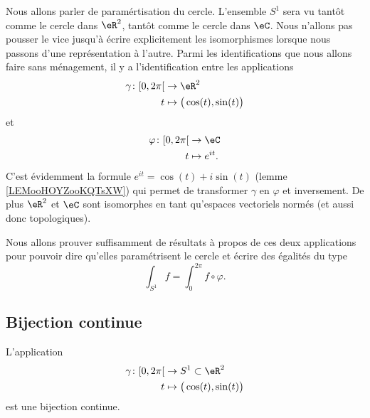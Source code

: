 Nous allons parler de paramértisation du cercle. L'ensemble \( S^1\) sera vu tantôt comme le cercle dans \( \eR^2\), tantôt comme le cercle dans \( \eC\). Nous n'allons pas pousser le vice jusqu'à écrire explicitement les isomorphismes lorsque nous passons d'une représentation à l'autre. Parmi les identifications que nous allons faire sans ménagement, il y a l'identification entre les applications
\begin{equation}
	\begin{aligned}
		\gamma\colon \mathopen[ 0 , 2\pi \mathclose[ & \to \eR^2                           \\
		t                                            & \mapsto \big( \cos(t),\sin(t) \big)
	\end{aligned}
\end{equation}
et
\begin{equation}
	\begin{aligned}
		\varphi\colon \mathopen[ 0 , 2\pi \mathclose[ & \to \eC          \\
		t                                             & \mapsto  e^{it}.
	\end{aligned}
\end{equation}
C'est évidemment la formule \(  e^{it}=\cos(t)+i\sin(t)\) (lemme \ref{LEMooHOYZooKQTsXW}) qui permet de transformer \( \gamma\) en \( \varphi\) et inversement. De plus \( \eR^2\) et \( \eC\) sont isomorphes en tant qu'espaces vectoriels normés (et aussi donc topologiques).


Nous allons prouver suffisamment de résultats à propos de ces deux applications pour pouvoir dire qu'elles paramétrisent le cercle et écrire des égalités du type
\begin{equation}
	\int_{S^1}f=\int_{0}^{2\pi}f\circ\varphi.
\end{equation}

\subsection{Bijection continue}

\begin{proposition}     \label{PROPooKSGXooOqGyZj}
	L'application
	\begin{equation}
		\begin{aligned}
			\gamma\colon \mathopen[ 0 , 2\pi \mathclose[ & \to S^1\subset \eR^2                \\
			t                                            & \mapsto \big( \cos(t),\sin(t) \big)
		\end{aligned}
	\end{equation}
	est une bijection continue.
\end{proposition}

